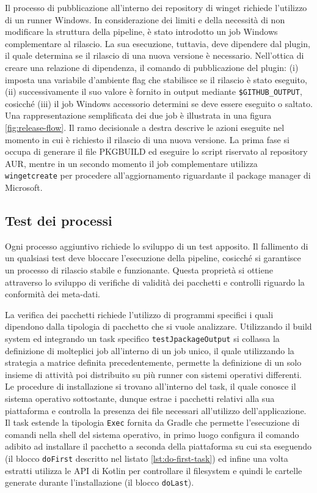 Il processo di pubblicazione all'interno dei repository di winget richiede l'utilizzo di un runner Windows. In considerazione dei limiti e della necessità di non modificare la struttura della pipeline, è stato introdotto un job Windows complementare al rilascio. La sua esecuzione, tuttavia, deve dipendere dal plugin, il quale determina se il rilascio di una nuova versione è necessario. Nell'ottica di creare una relazione di dipendenza, il comando di pubblicazione del plugin: (i) imposta una variabile d'ambiente flag che stabilisce se il rilascio è stato eseguito, (ii) successivamente il suo valore è fornito in output mediante \texttt{\$GITHUB\_OUTPUT}, cosicché (iii) il job Windows accessorio determini se deve essere eseguito o saltato. Una rappresentazione semplificata dei due job è illustrata in una figura \ref{fig:release-flow}. Il ramo decisionale a destra descrive le azioni eseguite nel momento in cui è richiesto il rilascio di una nuova versione. La prima fase si occupa di generare il file PKGBUILD ed eseguire lo script riservato al repository AUR, mentre in un secondo momento il job complementare utilizza \texttt{wingetcreate} per procedere all'aggiornamento riguardante il package manager di Microsoft.

\subsection{Test dei processi}

Ogni processo aggiuntivo richiede lo sviluppo di un test apposito. Il fallimento di un qualsiasi test deve bloccare l'esecuzione della pipeline, cosicché si garantisce un processo di rilascio stabile e funzionante. Questa proprietà si ottiene attraverso lo sviluppo di verifiche di validità dei pacchetti e controlli riguardo la conformità dei meta-dati.

La verifica dei pacchetti richiede l'utilizzo di programmi specifici i quali dipendono dalla tipologia di pacchetto che si vuole analizzare. Utilizzando il build system ed integrando un task specifico \texttt{testJpackageOutput} si collassa la definizione di molteplici job all'interno di un job unico, il quale utilizzando la strategia a matrice definita precedentemente, permette la definizione di un solo insieme di attività poi distribuito su più runner con sistemi operativi differenti. Le procedure di installazione si trovano all'interno del task, il quale conosce il sistema operativo sottostante, dunque estrae i pacchetti relativi alla sua piattaforma e controlla la presenza dei file necessari all'utilizzo dell'applicazione. Il task estende la tipologia \texttt{Exec} fornita da Gradle che permette l'esecuzione di comandi nella shell del sistema operativo, in primo luogo configura il comando adibito ad installare il pacchetto a seconda della piattaforma su cui sta eseguendo (il blocco \texttt{doFirst} descritto nel listato \ref{lst:do-first-task}) ed infine una volta estratti utilizza le API di Kotlin per controllare il filesystem e quindi le cartelle generate durante l'installazione (il blocco \texttt{doLast}).

